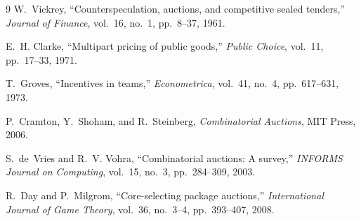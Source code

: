 \documentclass[11pt]{article}
\begin{document}
\begin{thebibliography}{9}
 W.~Vickrey, ``Counterspeculation, auctions, and competitive sealed tenders,'' \textit{Journal of Finance}, vol.~16, no.~1, pp.~8--37, 1961.

 E.~H. Clarke, ``Multipart pricing of public goods,'' \textit{Public Choice}, vol.~11, pp.~17--33, 1971.

 T.~Groves, ``Incentives in teams,'' \textit{Econometrica}, vol.~41, no.~4, pp.~617--631, 1973.

 P.~Cramton, Y.~Shoham, and R.~Steinberg, \textit{Combinatorial Auctions}, MIT Press, 2006.

 S.~de~Vries and R.~V. Vohra, ``Combinatorial auctions: A survey,'' \textit{INFORMS Journal on Computing}, vol.~15, no.~3, pp.~284--309, 2003.

 R.~Day and P.~Milgrom, ``Core-selecting package auctions,'' \textit{International Journal of Game Theory}, vol.~36, no.~3--4, pp.~393--407, 2008.
\end{thebibliography}
\end{document}
